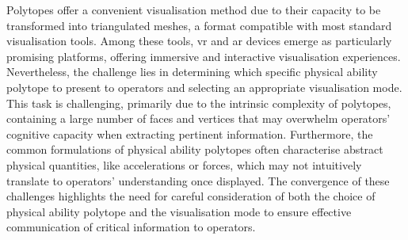 Polytopes offer a convenient visualisation method due to their capacity to be transformed into triangulated meshes, a format compatible with most standard visualisation tools. Among these tools, \gls{vr} and \gls{ar} devices emerge as particularly promising platforms, offering immersive and interactive visualisation experiences. Nevertheless, the challenge lies in determining which specific physical ability polytope to present to operators and selecting an appropriate visualisation mode. This task is challenging, primarily due to the intrinsic complexity of polytopes, containing a large number of faces and vertices that may overwhelm operators' cognitive capacity when extracting pertinent information. Furthermore, the common formulations of physical ability polytopes often characterise abstract physical quantities, like accelerations or forces, which may not intuitively translate to operators' understanding once displayed. The convergence of these challenges highlights the need for careful consideration of both the choice of physical ability polytope and the visualisation mode to ensure effective communication of critical information to operators.


